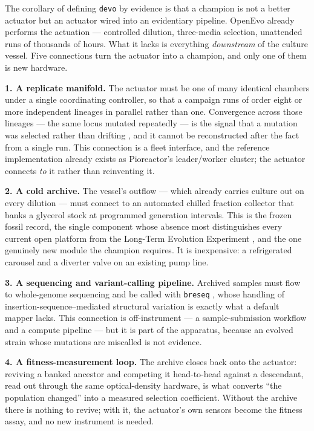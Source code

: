 \documentclass[11pt,a4paper]{article}
\newcommand{\code}[1]{\texttt{\small #1}}
\begin{document}
The corollary of defining \texttt{devo} by evidence is that a champion is not a better actuator
but an actuator wired into an evidentiary pipeline. OpenEvo already performs the
actuation --- controlled dilution, three-media selection, unattended runs of thousands of
hours. What it lacks is everything \emph{downstream} of the culture vessel. Five connections
turn the actuator into a champion, and only one of them is new hardware.

\textbf{1. A replicate manifold.} The actuator must be one of many identical chambers under a
single coordinating controller, so that a campaign runs of order eight or more independent
lineages in parallel rather than one. Convergence across those lineages --- the same locus
mutated repeatedly --- is the signal that a mutation was selected rather than drifting
\cite{blount2012cit}, and it cannot be reconstructed after the fact from a single run. This
connection is a fleet interface, and the reference implementation already exists as Pioreactor's
leader/worker cluster; the actuator connects \emph{to} it rather than reinventing it.

\textbf{2. A cold archive.} The vessel's outflow --- which already carries culture out on every
dilution --- must connect to an automated chilled fraction collector that banks a glycerol stock
at programmed generation intervals. This is the frozen fossil record, the single component whose
absence most distinguishes every current open platform from the Long-Term Evolution Experiment
\cite{barrick2023ltee}, and the one genuinely new module the champion requires. It is
inexpensive: a refrigerated carousel and a diverter valve on an existing pump line.

\textbf{3. A sequencing and variant-calling pipeline.} Archived samples must flow to
whole-genome sequencing and be called with \code{breseq} \cite{deatherage2014breseq}, whose
handling of insertion-sequence--mediated structural variation is exactly what a default mapper
lacks. This connection is off-instrument --- a sample-submission workflow and a compute
pipeline --- but it is part of the apparatus, because an evolved strain whose mutations are
miscalled is not evidence.

\textbf{4. A fitness-measurement loop.} The archive closes back onto the actuator: reviving a
banked ancestor and competing it head-to-head against a descendant, read out through the same
optical-density hardware, is what converts ``the population changed'' into a measured selection
coefficient. Without the archive there is nothing to revive; with it, the actuator's own sensors
become the fitness assay, and no new instrument is needed.
\end{document}
